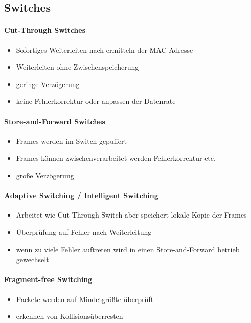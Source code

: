\documentclass[12pt,a4paper]{article}
\begin{document}
\subsection{Switches}
\paragraph{Cut-Through Switches}
\begin{itemize}
\item Sofortiges Weiterleiten nach ermitteln der MAC-Adresse
\item Weiterleiten ohne Zwischenspeicherung
\item geringe Verzögerung
\item keine Fehlerkorrektur oder anpassen der Datenrate
\end{itemize}
\paragraph{Store-and-Forward Switches}

\begin{itemize}
\item Frames werden im Switch gepuffert
\item Frames können zwischenverarbeitet werden Fehlerkorrektur etc.
\item große Verzögerung
\end{itemize}
\paragraph{Adaptive Switching / Intelligent Switching}

\begin{itemize}
\item Arbeitet wie Cut-Through Switch aber speichert lokale Kopie der Frames
\item Überprüfung auf Fehler nach Weiterleitung
\item wenn zu viele Fehler auftreten wird in einen Store-and-Forward betrieb gewechselt
\end{itemize}
\paragraph{Fragment-free Switching}

\begin{itemize}
\item Packete werden auf Mindetgrößte überprüft
\item erkennen von Kollisionsüberresten
\end{itemize}
\end{document}
